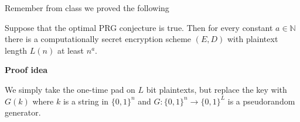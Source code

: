 \documentclass[10pt]{article}
\newcommand{\N}{\mathbb{N}}
\theoremstyle{definition}
\begin{document}
Remember from class we proved the following

Suppose that the optimal PRG conjecture is true. Then for every constant
$a\in \N$ there is a computationally secret encryption scheme $(E,D)$
with plaintext length $L(n)$ at least $n^a$.

\textbf{Proof idea}

We simply
take the one-time pad on $L$ bit plaintexts, but replace the key with
$G(k)$ where $k$ is a string in $\{0,1\}^n$ and
$G:\{0,1\}^n \rightarrow \{0,1\}^L$ is a pseudorandom generator.
\end{document}
